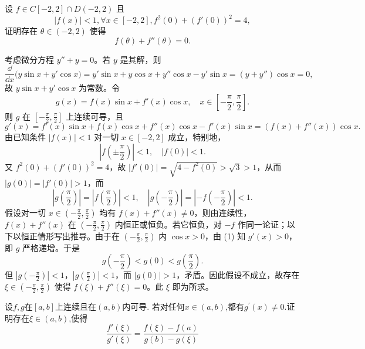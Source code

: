 \newpage
\begin{example}[$f(\theta) + f''(\theta) = 0$]
设 $f \in C[-2,2] \cap D(-2,2)$ 且
$$|f(x)| < 1, \forall x \in [-2,2], f^2(0) + (f'(0))^2 = 4,$$
证明存在 $\theta \in (-2,2)$ 使得
$$f(\theta) + f''(\theta) = 0.$$
\end{example}
\begin{solution}
考虑微分方程 $y''+y=0$。若 $y$ 是其解，则
\[
\frac{\dd}{\dd x}\bigl(y\sin x + y'\cos x\bigr)=y'\sin x+y\cos x+y''\cos x-y'\sin x=(y+y'')\cos x=0,
\]
故 $y\sin x+y'\cos x$ 为常数。令
\[
g(x)=f(x)\sin x+f'(x)\cos x,\quad x\in\left[-\frac{\pi}{2},\frac{\pi}{2}\right].
\]
则 $g$ 在 $\left[-\frac{\pi}{2},\frac{\pi}{2}\right]$ 上连续可导，且
\[
g'(x)=f'(x)\sin x+f(x)\cos x+f''(x)\cos x-f'(x)\sin x=(f(x)+f''(x))\cos x. \tag{1}
\]
由已知条件 $|f(x)|<1$ 对一切 $x\in[-2,2]$ 成立，特别地，
\[
|f(\pm\frac{\pi}{2})|<1,\quad |f(0)|<1.
\]
又 $f^2(0)+(f'(0))^2=4$，故 $|f'(0)|=\sqrt{4-f^2(0)}>\sqrt{3}>1$，从而 $|g(0)|=|f'(0)|>1$，而
\[
|g(\frac{\pi}{2})|=|f(\frac{\pi}{2})|<1,\quad |g(-\frac{\pi}{2})|=|-f(-\frac{\pi}{2})|<1.
\]
假设对一切 $x\in(-\frac{\pi}{2},\frac{\pi}{2})$ 均有 $f(x)+f''(x)\neq0$，则由连续性，$f(x)+f''(x)$ 在 $(-\frac{\pi}{2},\frac{\pi}{2})$ 内恒正或恒负。若它恒负，对 $-f$ 作同一论证；以下以恒正情形写出推导。由于在 $(-\frac{\pi}{2},\frac{\pi}{2})$ 内 $\cos x>0$，由 (1) 知 $g'(x)>0$，即 $g$ 严格递增。于是
\[
g\!\left(-\frac{\pi}{2}\right)<g(0)<g\!\left(\frac{\pi}{2}\right).
\]
但 $|g(-\frac{\pi}{2})|<1$，$|g(\frac{\pi}{2})|<1$，而 $|g(0)|>1$，矛盾。因此假设不成立，故存在 $\xi\in(-\frac{\pi}{2},\frac{\pi}{2})$ 使得 $f(\xi)+f''(\xi)=0$。此 $\xi$ 即为所求。
\end{solution}
\newpage
\begin{example}[$\frac{f'\left(\xi\right)}{g'\left(\xi\right)}=\frac{f\left(\xi\right)-f\left(a\right)}{g\left(b\right)-g\left(\xi\right)}$]
设$f,g$在$[a,b]$上连续且在$(a,b)$内可导. 若对任何$x\in(a,b)$,都有$g^\prime(x)\neq0.$证明存在$\xi\in(a,b)$,使得$$\frac{f'\left(\xi\right)}{g'\left(\xi\right)}=\frac{f\left(\xi\right)-f\left(a\right)}{g\left(b\right)-g\left(\xi\right)}$$
\end{example}
